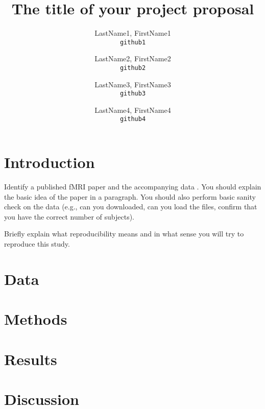 \documentclass[11pt]{article}
\title{The title of your project proposal}
\author{
  LastName1, FirstName1\\
  \texttt{github1}
  \and
  LastName2, FirstName2\\
  \texttt{github2}
  \and
  LastName3, FirstName3\\
  \texttt{github3}
  \and
  LastName4, FirstName4\\
  \texttt{github4}
}
\begin{document}
\maketitle


\section{Introduction}

Identify a published fMRI paper and the accompanying data
\cite{lindquist2008statistical}.  You should explain the basic idea of the
paper in a paragraph.  You should also perform basic sanity check on the data
(e.g., can you downloaded, can you load the files, confirm that you have the
correct number of subjects).

Briefly explain what reproducibility means and in what sense you will
try to reproduce this study.

\section{Data}

\section{Methods}
\section{Results}
\section{Discussion}



\end{document}
